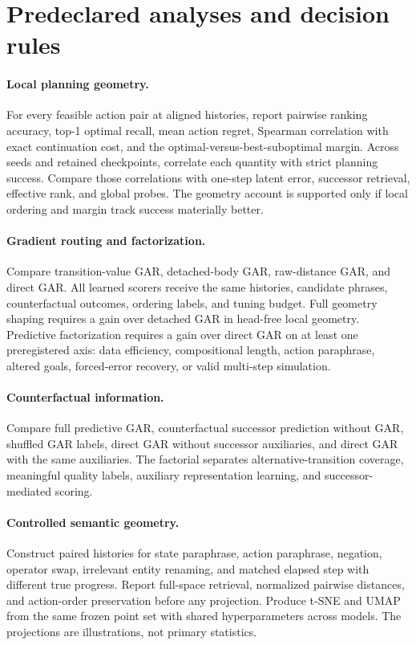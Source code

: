 \section{Predeclared analyses and decision rules}

\paragraph{Local planning geometry.}
For every feasible action pair at aligned histories, report pairwise ranking accuracy, top-1 optimal recall, mean action regret, Spearman correlation with exact continuation cost, and the optimal-versus-best-suboptimal margin. Across seeds and retained checkpoints, correlate each quantity with strict planning success. Compare those correlations with one-step latent error, successor retrieval, effective rank, and global probes. The geometry account is supported only if local ordering and margin track success materially better.

\paragraph{Gradient routing and factorization.}
Compare transition-value GAR, detached-body GAR, raw-distance GAR, and direct GAR. All learned scorers receive the same histories, candidate phrases, counterfactual outcomes, ordering labels, and tuning budget. Full geometry shaping requires a gain over detached GAR in head-free local geometry. Predictive factorization requires a gain over direct GAR on at least one preregistered axis: data efficiency, compositional length, action paraphrase, altered goals, forced-error recovery, or valid multi-step simulation.

\paragraph{Counterfactual information.}
Compare full predictive GAR, counterfactual successor prediction without GAR, shuffled GAR labels, direct GAR without successor auxiliaries, and direct GAR with the same auxiliaries. The factorial separates alternative-transition coverage, meaningful quality labels, auxiliary representation learning, and successor-mediated scoring.

\paragraph{Controlled semantic geometry.}
Construct paired histories for state paraphrase, action paraphrase, negation, operator swap, irrelevant entity renaming, and matched elapsed step with different true progress. Report full-space retrieval, normalized pairwise distances, and action-order preservation before any projection. Produce t-SNE and UMAP from the same frozen point set with shared hyperparameters across models. The projections are illustrations, not primary statistics.

